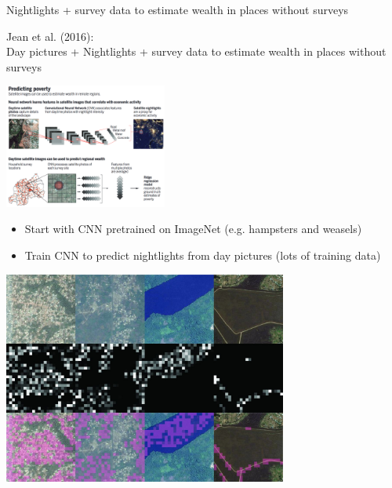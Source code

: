 \documentclass[aspectratio=169]{beamer}
\begin{document}
\begin{frame}

Nightlights + survey data to estimate wealth in places without surveys

\end{frame}
\begin{frame}

Jean et al. (2016):\\
Day pictures + Nightlights + survey data to estimate wealth in places without surveys

\end{frame}
\begin{frame}

\begin{center}
\includegraphics[width=0.4\textwidth]{figures/blumenstock_fighting_2016_fig}
\end{center}

\begin{itemize}
\item Start with CNN pretrained on ImageNet (e.g. hampsters and weasels)
\pause
\item Train CNN to predict nightlights from day pictures (lots of training data)
\end{itemize}

\end{frame}
\begin{frame}

\begin{center}
\includegraphics[width=0.7\textwidth]{figures/jean_combining_2016_fig2}
\end{center}

\end{frame}
\end{document}
